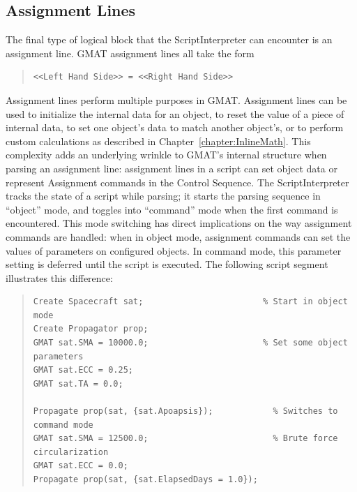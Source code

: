 \subsection{\label{section:ParsingAssignments}Assignment Lines}

The final type of logical block that the ScriptInterpreter can encounter is an assignment line.
GMAT assignment lines all take the form

\begin{quote}
\begin{verbatim}
<<Left Hand Side>> = <<Right Hand Side>>
\end{verbatim}
\end{quote}

\noindent Assignment lines perform multiple purposes in GMAT.  Assignment lines can be used to
initialize the internal data for an object, to reset the value of a piece of internal data, to set
one object's data to match another object's, or to perform custom calculations as described in
Chapter~\ref{chapter:InlineMath}.  This complexity adds an underlying wrinkle to GMAT's internal
structure when parsing an assignment line: assignment lines in a script can set object data or
represent Assignment commands in the Control Sequence.  The ScriptInterpreter tracks the state of
a script while parsing; it starts the parsing sequence in ``object'' mode, and toggles into
``command'' mode when the first command is encountered.  This mode switching has direct implications
on the way assignment commands are handled: when in object mode, assignment commands can set the
values of parameters on configured objects.  In command mode, this parameter setting is deferred
until the script is executed.  The following script segment illustrates this difference:

\begin{quote}
\linenumbers[1]
\begin{verbatim}
Create Spacecraft sat;                        % Start in object mode
Create Propagator prop;
GMAT sat.SMA = 10000.0;                       % Set some object parameters
GMAT sat.ECC = 0.25;
GMAT sat.TA = 0.0;

Propagate prop(sat, {sat.Apoapsis});            % Switches to command mode
GMAT sat.SMA = 12500.0;                         % Brute force circularization
GMAT sat.ECC = 0.0;
Propagate prop(sat, {sat.ElapsedDays = 1.0});
\end{verbatim}
\nolinenumbers
\end{quote}

